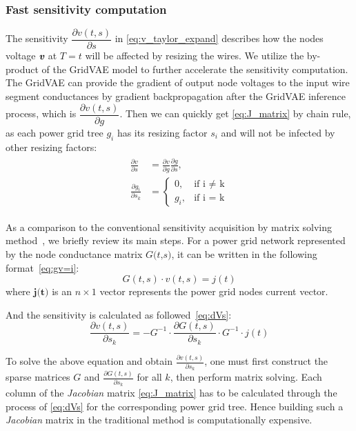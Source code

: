 \subsubsection{Fast sensitivity computation}

The sensitivity $ \dfrac{\partial v(t, s)}{\partial s}$ in  \eqref{eq:v_taylor_expand} describes how the nodes voltage $\textit{\textbf{v}}$ at $\textit{T}= t$ will be affected by resizing the wires. We utilize the by-product of the GridVAE model to further accelerate the sensitivity computation. The GridVAE can provide the gradient of output node voltages to the input wire segment conductances by gradient backpropagation after the GridVAE inference process, which is $ \dfrac{\partial v(t, s)}{\partial g}$. Then we can quickly get \eqref{eq:J_matrix} by chain rule, as each power grid tree $g_{i}$ has its resizing factor $s_{i}$ and will not be infected by other resizing factors:
\begin{equation}
	\label{eq:chain_rule}
	\begin{aligned}
	\begin{split}
	\frac{\partial v}{\partial s} & =\frac{\partial v}{\partial g} \frac{\partial g}{\partial s}, \\ 
	\frac{\partial g_{i}}{\partial s_{k}} & = 
    	\begin{cases}
        		0,      &\mbox{if i $\neq$ k} \\ 
        		g_{i},  &\mbox{if i = k} 
    	\end{cases}
	\end{split}
	\end{aligned}
\end{equation}

As a comparison to the conventional sensitivity acquisition by matrix solving method~\cite{Sukharev:2019pg}, we briefly review its main steps.
For a power grid network represented by the node conductance matrix $ \textit{G(t,s)}$, it can be written in the following format~\eqref{eq:gv=i}:
\begin{equation}
	\label{eq:gv=i}
	G(t,s)\cdot v(t,s)= j(t)
\end{equation}
where $\textbf{j(t)}$  is an $n\times 1$ vector represents the power grid nodes current vector.

And the sensitivity is calculated as followed~\eqref{eq:dVs}: 
\begin{equation}
	\label{eq:dVs}
	\dfrac{\partial v(t,s)}{\partial s_{k}} = -G^{-1}\cdot \dfrac{\partial G(t,s)}{\partial s_{k}}  \cdot G^{-1}\cdot j(t)
\end{equation}

To solve the above equation and obtain $ \frac{\partial v(t,s)}{\partial s_{k}}$, one must first construct the sparse matrices $\textit{G}$ and $\frac{\partial G(t,s)}{\partial s_{k}}$ for all $k$, then perform matrix solving. 
Each column of the \textit{Jacobian} matrix \eqref{eq:J_matrix} has to be calculated through the process of \eqref{eq:dVs} for the corresponding power grid tree. Hence building such a \textit{Jacobian} matrix in the traditional method is computationally expensive.










